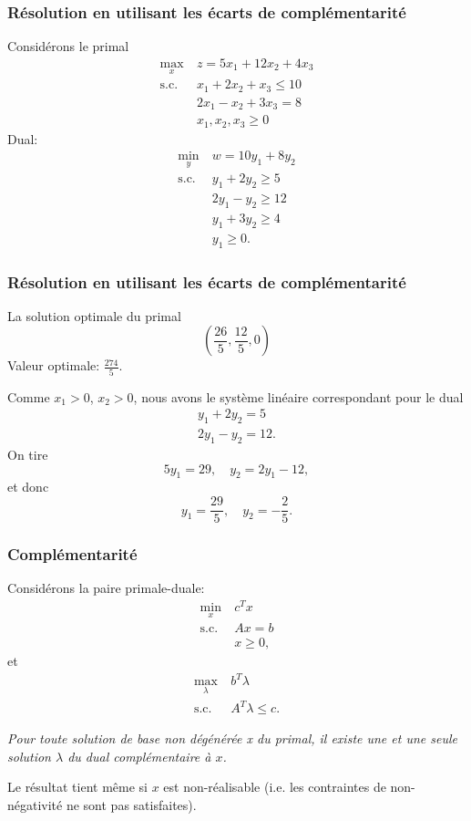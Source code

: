 \documentclass[usepdftitle=false]{beamer}
\begin{document}
\begin{frame}
	\frametitle{Résolution en utilisant les écarts de complémentarité}
	
	Considérons le primal
	\begin{align*}
		\max_x\ & z = 5x_1 +12x_2 +4x_3\\
		\mbox{s.c. } & x_1 + 2x_2 + x_3 \leq 10 \\
		& 2x_1 - x_2 +3x_3 = 8 \\
		& x_1, x_2, x_3 \geq 0
	\end{align*}
	Dual:
	\begin{align*}
		\min_y\ & w = 10y_1 + 8y_2 \\
		\mbox{s.c. } & y_1 + 2y_2 \geq 5 \\
		& 2y_1 - y_2 \geq 12 \\
		& y_1 + 3y_2 \geq 4\\
		& y_1 \geq 0.
	\end{align*}
	
\end{frame}

\begin{frame}
	\frametitle{Résolution en utilisant les écarts de complémentarité}
	
	La solution optimale du primal
	\[
	\left(
	\frac{26}{5}, \frac{12}{5}, 0
	\right)
	\]
	Valeur optimale: $\frac{274}{5}$.
	
	\mbox{}
	
	Comme $x_1 > 0$, $x_2 > 0$, nous avons le système linéaire correspondant pour le dual
	\begin{align*}
		y_1 + 2y_2 = 5\\
		2y_1 - y_2 = 12.
	\end{align*}
	On tire
	\[
	5y_1 = 29,\quad y_2 = 2y_1 - 12,
	\]
	et donc
	\[
	y_1 = \frac{29}{5},\quad y_2 = -\frac{2}{5}.
	\]
	
\end{frame}

\begin{frame}
	\frametitle{Complémentarité}
	
	Considérons la paire primale-duale:
	\begin{align*}
		\min_x\ & c^T x \\
		\mbox{s.c. } & Ax = b \\
		& x \geq 0,
	\end{align*}
	et
	\begin{align*}
		\max_{\lambda} \ & b^T \lambda \\
		\mbox{s.c. } & A^T \lambda \leq c.
	\end{align*}
	
	\textit{Pour toute solution de base non dégénérée x du primal, il existe une et une seule solution $\lambda$ du dual complémentaire à $x$.}
	
	Le résultat tient même si $x$ est non-réalisable (i.e. les contraintes de non-négativité ne sont pas satisfaites).
	
\end{frame}
\end{document}
